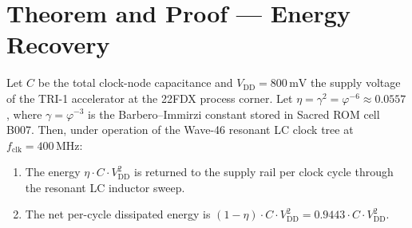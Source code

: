 \section{Theorem and Proof --- Energy Recovery}
\label{sec:theorem-w46}

\begin{theorem}\label{thm:energy-recovery-w46}
Let $C$ be the total clock-node capacitance and $V_{\mathrm{DD}} = 800\,\text{mV}$
the supply voltage of the TRI-1 accelerator at the 22FDX process corner.
Let $\eta = \gamma^{2} = \varphi^{-6} \approx 0.0557$, where
$\gamma = \varphi^{-3}$ is the Barbero--Immirzi constant stored in
Sacred ROM cell B007.
Then, under operation of the Wave-46 resonant LC clock tree at
$f_{\mathrm{clk}} = 400\,\text{MHz}$:
\begin{enumerate}
  \item The energy $\eta \cdot C \cdot V_{\mathrm{DD}}^{2}$ is returned to the
        supply rail per clock cycle through the resonant LC inductor sweep.
  \item The net per-cycle dissipated energy is
        $(1-\eta) \cdot C \cdot V_{\mathrm{DD}}^{2} = 0.9443 \cdot C \cdot V_{\mathrm{DD}}^{2}$.
\end{enumerate}
\end{theorem}

